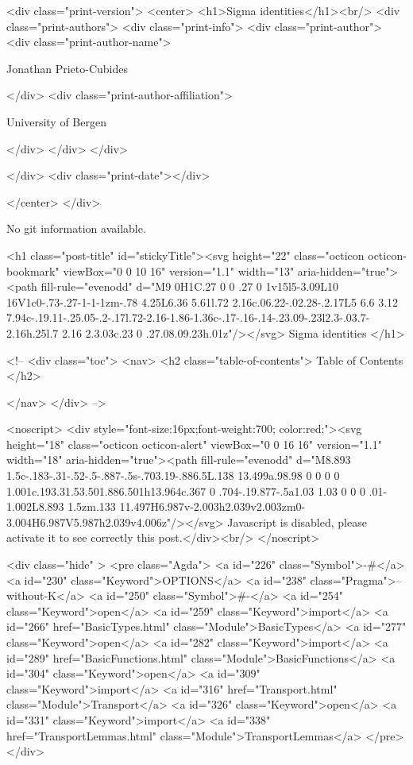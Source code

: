   <div class="print-version">
    <center>
      <h1>Sigma identities</h1><br/>
        <div class="print-authors">
          <div class="print-info">
            <div class="print-author">
              <div class="print-author-name">
                
                  Jonathan Prieto-Cubides
                
              </div>
              <div class="print-author-affiliation">
                
                  University of Bergen
                
                </div>
            </div>
          </div>
          
          
        </div>
        <div class="print-date"></div>
        
        
    </center>
  </div>

  
  No git information available.
  
  <h1 class="post-title" id="stickyTitle"><svg height="22" class="octicon octicon-bookmark" viewBox="0 0 10 16" version="1.1" width="13" aria-hidden="true"><path fill-rule="evenodd" d="M9 0H1C.27 0 0 .27 0 1v15l5-3.09L10 16V1c0-.73-.27-1-1-1zm-.78 4.25L6.36 5.61l.72 2.16c.06.22-.02.28-.2.17L5 6.6 3.12 7.94c-.19.11-.25.05-.2-.17l.72-2.16-1.86-1.36c-.17-.16-.14-.23.09-.23l2.3-.03.7-2.16h.25l.7 2.16 2.3.03c.23 0 .27.08.09.23h.01z"/></svg> Sigma identities
  </h1>

  <!-- 
  <div class="toc">
    <nav>
    <h2 class="table-of-contents"> Table of Contents </h2>
      

    </nav>
  </div>
   -->

  <noscript>
  <div style="font-size:16px;font-weight:700; color:red;"><svg height="18" class="octicon octicon-alert" viewBox="0 0 16 16" version="1.1" width="18" aria-hidden="true"><path fill-rule="evenodd" d="M8.893 1.5c-.183-.31-.52-.5-.887-.5s-.703.19-.886.5L.138 13.499a.98.98 0 0 0 0 1.001c.193.31.53.501.886.501h13.964c.367 0 .704-.19.877-.5a1.03 1.03 0 0 0 .01-1.002L8.893 1.5zm.133 11.497H6.987v-2.003h2.039v2.003zm0-3.004H6.987V5.987h2.039v4.006z"/></svg> Javascript is disabled, please activate it to see correctly this post.</div><br/>
  </noscript>

  <div class="hide" >
<pre class="Agda">
<a id="226" class="Symbol">{-#</a> <a id="230" class="Keyword">OPTIONS</a> <a id="238" class="Pragma">--without-K</a> <a id="250" class="Symbol">#-}</a>
<a id="254" class="Keyword">open</a> <a id="259" class="Keyword">import</a> <a id="266" href="BasicTypes.html" class="Module">BasicTypes</a>
<a id="277" class="Keyword">open</a> <a id="282" class="Keyword">import</a> <a id="289" href="BasicFunctions.html" class="Module">BasicFunctions</a>
<a id="304" class="Keyword">open</a> <a id="309" class="Keyword">import</a> <a id="316" href="Transport.html" class="Module">Transport</a>
<a id="326" class="Keyword">open</a> <a id="331" class="Keyword">import</a> <a id="338" href="TransportLemmas.html" class="Module">TransportLemmas</a>
</pre>
</div>

